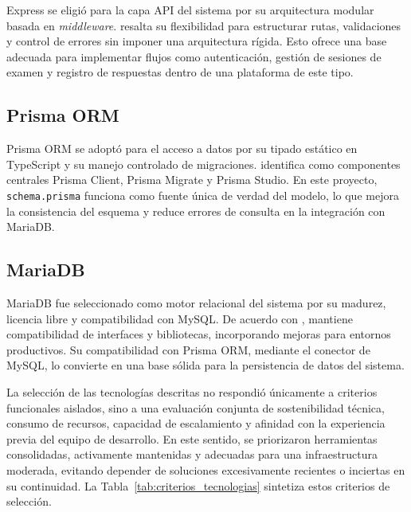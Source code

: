 Express se eligió para la capa API del sistema por su arquitectura modular basada en \textit{middleware}. \textcite{express} resalta su flexibilidad para estructurar rutas, validaciones y control de errores sin imponer una arquitectura rígida. Esto ofrece una base adecuada para implementar flujos como autenticación, gestión de sesiones de examen y registro de respuestas dentro de una plataforma de este tipo.

\subsection{Prisma ORM}

Prisma ORM se adoptó para el acceso a datos por su tipado estático en TypeScript y su manejo controlado de migraciones. \textcite{prisma} identifica como componentes centrales Prisma Client, Prisma Migrate y Prisma Studio. En este proyecto, \texttt{schema.prisma} funciona como fuente única de verdad del modelo, lo que mejora la consistencia del esquema y reduce errores de consulta en la integración con MariaDB.

\subsection{MariaDB}

MariaDB fue seleccionado como motor relacional del sistema por su madurez, licencia libre y compatibilidad con MySQL. De acuerdo con \textcite{mariadb}, mantiene compatibilidad de interfaces y bibliotecas, incorporando mejoras para entornos productivos. Su compatibilidad con Prisma ORM, mediante el conector de MySQL, lo convierte en una base sólida para la persistencia de datos del sistema.

La selección de las tecnologías descritas no respondió únicamente a criterios funcionales aislados, sino a una evaluación conjunta de sostenibilidad técnica, consumo de recursos, capacidad de escalamiento y afinidad con la experiencia previa del equipo de desarrollo. En este sentido, se priorizaron herramientas consolidadas, activamente mantenidas y adecuadas para una infraestructura moderada, evitando depender de soluciones excesivamente recientes o inciertas en su continuidad. La Tabla~\ref{tab:criterios_tecnologias} sintetiza estos criterios de selección.

